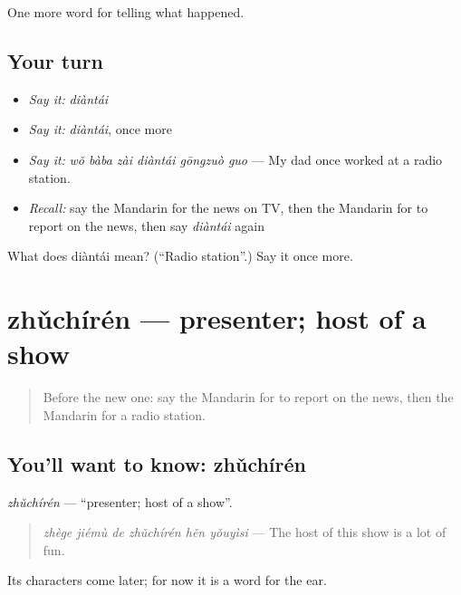 \begin{grammarlens}[title={What you've built}]
One more word for telling what happened.
\end{grammarlens}

\subsection*{Your turn}
\begin{itemize}
\raggedright
  \item \emph{Say it:} \emph{diàntái}
  \item \emph{Say it:} \emph{diàntái}, once more
  \item \emph{Say it:} \emph{wǒ bàba zài diàntái gōngzuò guo} — My dad once worked at a radio station.
  \item \emph{Recall:} say the Mandarin for the news on TV, then the Mandarin for to report on the news, then say \emph{diàntái} again
\end{itemize}

\begin{tcolorbox}[breakable,colback=teal!4,colframe=teal!35!black,title={Before you move on}]
What does diàntái mean? (\textquotedblleft{}Radio station\textquotedblright{}.) Say it once more.
\end{tcolorbox}
\section[zhǔchírén]{zhǔchírén — presenter; host of a show}

\label{lesson:ZH-C290-zhuchiren}



\begin{quote}
Before the new one: say the Mandarin for to report on the news, then the Mandarin for a radio station.
\end{quote}

\subsection*{You'll want to know: zhǔchírén}
\emph{zhǔchírén} — \textquotedblleft{}presenter; host of a show\textquotedblright{}.

\begin{quote}
\emph{zhège jiémù de zhǔchírén hěn yǒuyìsi} — The host of this show is a lot of fun.
\end{quote}

Its characters come later; for now it is a word for the ear.

